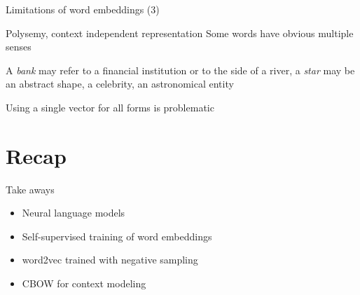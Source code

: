 \documentclass[12pt,aspectratio=169,handout]{beamer}
\begin{document}
\begin{frame}{Limitations of word embeddings (3)}
	
\begin{block}{Polysemy, context independent representation}
Some words have obvious multiple senses

A \emph{bank} may refer to a financial institution or to the side of a river, a \emph{star} may be an abstract shape, a celebrity, an astronomical entity

Using a single vector for all forms	is problematic
\end{block}


\end{frame}


\section*{Recap}



\begin{frame}{Take aways}
	
\begin{itemize}
	\item Neural language models
	\item Self-supervised training of word embeddings
	\item word2vec trained with negative sampling
	\item CBOW for context modeling
\end{itemize}
	
\end{frame}
\end{document}

